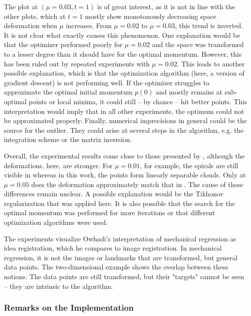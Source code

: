 The plot at $(\mu=0.03, t=1)$ is of great interest, as it is not in line with the other plots, which at $t=1$ mostly show monotonously decreasing space deformation when $\mu$ increases.
From $\mu = 0.02$ to $\mu = 0.03$, this trend is inverted.
It is not clear what exactly causes this phenomenon.
One explanation would be that the optimizer performed poorly for $\mu=0.02$ and the space was transformed to a lesser degree than it should have for the optimal momentum.
However, this has been ruled out by repeated experiments with $\mu = 0.02$.
This leads to another possible explanation, which is that the optimization algorithm (here, a version of gradient descent) is not performing well.
If the optimizer struggles to approximate the optimal initial momentum $p(0)$ and mostly remains at sub-optimal points or local minima, it could still -- by chance -- hit better points.
This interpretation would imply that in all other experiments, the optimum could not be approximated properly.
Finally, numerical imprecisions in general could be the source for the outlier.
They could arise at several steps in the algorithm, e.g. the integration scheme or the matrix inversion.

Overall, the experimental results come close to those presented by \citet{owhadi20}, although the deformations, here, are stronger.
For $\mu = 0.01$, for example, the spirals are still visible in \cite{owhadi20} whereas in this work, the points form linearly separable clouds.
Only at $\mu = 0.05$ does the deformation approximately match that in \cite{owhadi20}.
The cause of these differences remain unclear.
A possible explanation would be the Tikhonov regularization that was applied here.
It is also possible that the search for the optimal momentum was performed for more iterations or that different optimization algorithms were used.

The experiments visualize Owhadi's \cite{owhadi20} interpretation of mechanical regression as idea registration, which he compares to image registration.
In mechanical regression, it is not the images or landmarks that are transformed, but general data points.
The two-dimensional example shows the overlap between these notions.
The data points are still transformed, but their "targets" cannot be seen -- they are intrinsic to the algorithm.

\subsubsection{Remarks on the Implementation}

